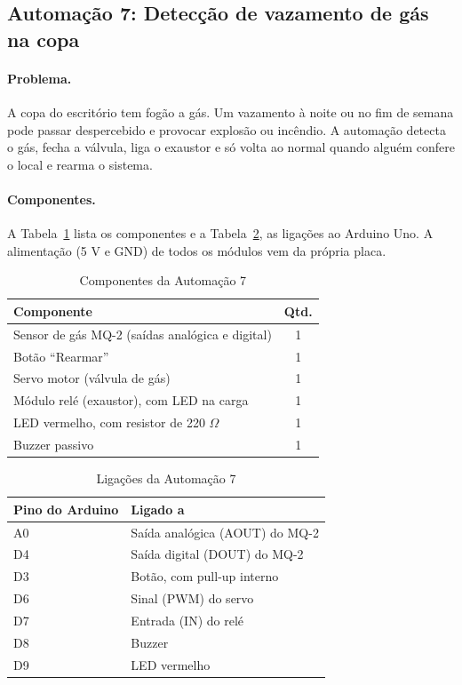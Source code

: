 \documentclass[12pt]{article}
\begin{document}
\subsection{Automação 7: Detecção de vazamento de gás na copa}\label{sub:a7}

\paragraph{Problema.} A copa do escritório tem fogão a gás. Um vazamento à noite ou no fim de semana pode passar despercebido e provocar explosão ou incêndio. A automação detecta o gás, fecha a válvula, liga o exaustor e só volta ao normal quando alguém confere o local e rearma o sistema.

\paragraph{Componentes.} A Tabela~\ref{tab:comp7} lista os componentes e a Tabela~\ref{tab:lig7}, as ligações ao Arduino Uno. A alimentação (5 V e GND) de todos os módulos vem da própria placa.

\begin{table}[!htb]
\centering
\caption{Componentes da Automação 7}\label{tab:comp7}
\small
\begin{tabularx}{\textwidth}{Xc}
\toprule
Componente & Qtd. \\
\midrule
Sensor de gás MQ-2 (saídas analógica e digital) & 1 \\
Botão ``Rearmar'' & 1 \\
Servo motor (válvula de gás) & 1 \\
Módulo relé (exaustor), com LED na carga & 1 \\
LED vermelho, com resistor de 220 $\Omega$ & 1 \\
Buzzer passivo & 1 \\
\bottomrule
\end{tabularx}
\end{table}

\begin{table}[!htb]
\centering
\caption{Ligações da Automação 7}\label{tab:lig7}
\small
\begin{tabularx}{\textwidth}{lX}
\toprule
Pino do Arduino & Ligado a \\
\midrule
A0 & Saída analógica (AOUT) do MQ-2 \\
D4 & Saída digital (DOUT) do MQ-2 \\
D3 & Botão, com pull-up interno \\
D6 & Sinal (PWM) do servo \\
D7 & Entrada (IN) do relé \\
D8 & Buzzer \\
D9 & LED vermelho \\
\bottomrule
\end{tabularx}
\end{table}
\end{document}
